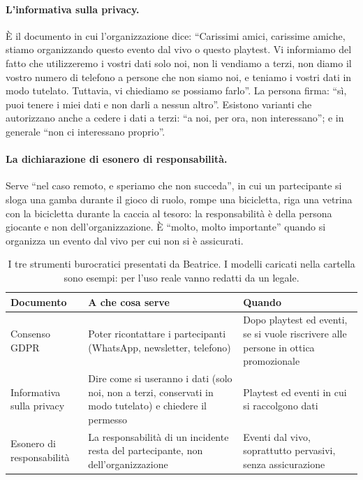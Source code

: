\paragraph{L'informativa sulla privacy.} È il documento in cui l'organizzazione dice:
``Carissimi amici, carissime amiche, stiamo organizzando questo evento dal vivo o
questo playtest. Vi informiamo del fatto che utilizzeremo i vostri dati solo noi, non
li vendiamo a terzi, non diamo il vostro numero di telefono a persone che non siamo
noi, e teniamo i vostri dati in modo tutelato. Tuttavia, vi chiediamo se possiamo
farlo''. La persona firma: ``sì, puoi tenere i miei dati e non darli a nessun altro''.
Esistono varianti che autorizzano anche a cedere i dati a terzi: ``a noi, per ora, non
interessano''; e in generale ``non ci interessano proprio''.

\paragraph{La dichiarazione di esonero di responsabilità.} Serve ``nel caso remoto, e
speriamo che non succeda'', in cui un partecipante si sloga una gamba durante il gioco
di ruolo, rompe una bicicletta, riga una vetrina con la bicicletta durante la caccia
al tesoro: la responsabilità è della persona giocante e non dell'organizzazione. È
``molto, molto importante'' quando si organizza un evento dal vivo per cui non si è
assicurati.

\begin{table}[htbp]
\centering
\small
\begin{tabular}{@{}p{3.6cm}p{4.8cm}p{4.8cm}@{}}
\toprule
\textbf{Documento} & \textbf{A che cosa serve} & \textbf{Quando} \\
\midrule
Consenso GDPR & Poter ricontattare i partecipanti (WhatsApp, newsletter,
  telefono) & Dopo playtest ed eventi, se si vuole riscrivere alle persone in ottica
  promozionale \\
Informativa sulla privacy & Dire come si useranno i dati (solo noi, non a terzi,
  conservati in modo tutelato) e chiedere il permesso & Playtest ed eventi in cui si
  raccolgono dati \\
Esonero di responsabilità & La responsabilità di un incidente resta del
  partecipante, non dell'organizzazione & Eventi dal vivo, soprattutto pervasivi,
  senza assicurazione \\
\bottomrule
\end{tabular}
\caption{I tre strumenti burocratici presentati da Beatrice. I modelli caricati nella
cartella sono esempi: per l'uso reale vanno redatti da un legale.}
\label{a9:tab:legale}
\end{table}

